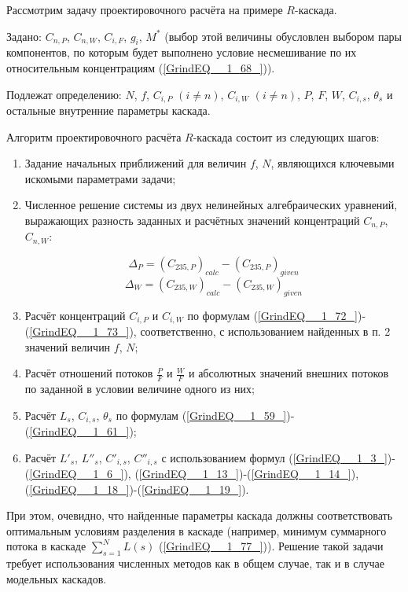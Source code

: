 Рассмотрим задачу проектировочного расчёта на примере $R$-каскада. 

Задано: $C_{n,P}$, $C_{n,W}$, $C_{i,F}$, $g_i$, $M^{*}$ (выбор этой величины обусловлен выбором пары компонентов, по которым будет выполнено условие несмешивание по их относительным концентрациям (\ref{GrindEQ__1_68_})).

Подлежат определению: $N$, $f$, $C_{i,P}$ $(i\neq n)$, $C_{i,W}$ $(i\neq n)$, $P$, $F$, $W$, $C_{i, s}$, $\theta_{s}$ и остальные внутренние параметры каскада. 

Алгоритм проектировочного расчёта $R$-каскада состоит из следующих шагов:

\begin{enumerate}
  \item Задание начальных приближений для величин $f$, $N$, являющихся ключевыми искомыми параметрами задачи; 
  \item Численное решение системы из двух нелинейных алгебраических уравнений, выражающих разность заданных и расчётных значений концентраций $C_{n,P}$, $C_{n,W}$:
  
  \begin{equation}
  \label{dis_235P}
  \Delta_{P} = {(C_{235, P})}_{calc}-{(C_{235, P})}_{given}
\end{equation}
\begin{equation}
  \label{dis_235W}
  \Delta_{W} = {(C_{235, W})}_{calc}-{(C_{235, W})}_{given}
\end{equation}
    
  \item Расчёт концентраций $C_{i,P}$ и $C_{i,W}$ по формулам (\ref{GrindEQ__1_72_})-(\ref{GrindEQ__1_73_}), соответственно, с использованием найденных в п. 2 значений величин $f$, $N$;
  \item Расчёт отношений потоков  $\frac{P}{F}$ и $\frac{W}{F}$ и абсолютных значений внешних потоков по заданной в условии величине одного из них; 
  \item Расчёт $L_{s}$, $C_{i, s}$, $\theta_{s}$ по формулам (\ref{GrindEQ__1_59_})-(\ref{GrindEQ__1_61_});
  \item Расчёт ${L'}_{s}$, ${L''}_{s}$, $C'_{i, s} $, $C''_{i, s}$ с использованием формул (\ref{GrindEQ__1_3_})-(\ref{GrindEQ__1_6_}), (\ref{GrindEQ__1_13_})-(\ref{GrindEQ__1_14_}), (\ref{GrindEQ__1_18_})-(\ref{GrindEQ__1_19_}).
\end{enumerate}

При этом, очевидно, что найденные параметры каскада должны соответствовать оптимальным условиям разделения в каскаде (например, минимум суммарного потока в каскаде $\sum _{s=1}^{N}L(s)$ (\ref{GrindEQ__1_77_})). Решение такой задачи требует использования численных методов как в общем случае, так и в случае модельных каскадов. 

